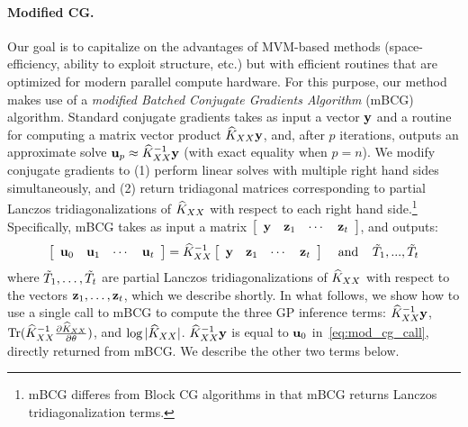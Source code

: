 \paragraph{Modified CG.}
Our goal is to capitalize on the advantages of MVM-based methods (space-efficiency, ability to exploit structure, etc.) but with efficient routines that are optimized for modern parallel compute hardware.
For this purpose, our method makes use of a \emph{modified Batched Conjugate Gradients Algorithm} (mBCG) algorithm.
Standard conjugate gradients takes as input a vector $\mathbf{y}$ and a routine for computing a matrix vector product $\widehat{K}_{XX}\mathbf{y}$, and, after $p$ iterations, outputs an approximate solve $\mathbf{u}_{p} \approx \widehat{K}_{XX}^{-1}\mathbf{y}$ (with exact equality when $p = n$).
We modify conjugate gradients to (1) perform linear solves with multiple right hand sides simultaneously, and (2) return tridiagonal matrices corresponding to partial Lanczos tridiagonalizations of $\widehat{K}_{XX}$ with respect to each right hand side.\footnote{
  mBCG differes from Block CG algorithms \cite{o1980block} in that mBCG returns Lanczos tridiagonalization terms.
} Specifically, mBCG takes as input a matrix $\left[\begin{array}{cccc}\mathbf{y} & \mathbf{z}_{1} & \cdots & \mathbf{z}_{t}\end{array}\right]$, and outputs:
\begin{equation}
  \label{eq:mod_cg_call}
  \left[\begin{array}{cccc}\mathbf{u}_{0} & \mathbf{u}_{1} & \cdots & \mathbf{u}_{t}\end{array}\right] = \widehat{K}_{XX}^{-1}\left[\begin{array}{cccc}\mathbf{y} & \mathbf{z}_{1} & \cdots & \mathbf{z}_{t}\end{array}\right]\;\;\;\;\textrm{and}\;\;\;\; \tilde{T}_{1},...,\tilde{T}_{t}
\end{equation}
where $\tilde{T}_{1},\ldots,\tilde{T}_{t}$ are partial Lanczos tridiagonalizations of $\widehat{K}_{XX}$ with respect to the vectors $\mathbf{z}_{1},\ldots,\mathbf{z}_{t}$, which we describe shortly.
In what follows, we show how to use a single call to mBCG to compute the three GP inference terms: $\widehat{K}_{XX}^{-1} \mathbf{y}$, $\tr{ \trainK^{-1} \frac{\partial \trainK}{\partial \theta} }$, and $\log \vert \widehat{K}_{XX} \vert$.
%
$\widehat{K}_{XX}^{-1}\mathbf{y}$ is equal to $\mathbf{u}_{0}$ in~\eqref{eq:mod_cg_call}, directly returned from mBCG. We describe the other two terms below.

